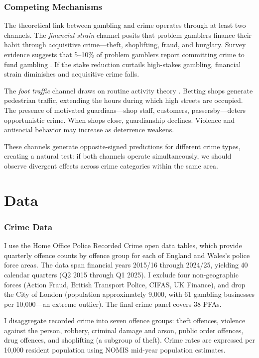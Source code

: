 \documentclass[12pt]{article}
\begin{document}
\subsubsection*{Competing Mechanisms} The theoretical link between gambling and crime operates through at least two channels. The \textit{financial strain} channel posits that problem gamblers finance their habit through acquisitive crime---theft, shoplifting, fraud, and burglary. Survey evidence suggests that 5--10\% of problem gamblers report committing crime to fund gambling \citep{banks2020gambling}. If the stake reduction curtails high-stakes gambling, financial strain diminishes and acquisitive crime falls.

The \textit{foot traffic} channel draws on routine activity theory \citep{cohen1979social}. Betting shops generate pedestrian traffic, extending the hours during which high streets are occupied. The presence of motivated guardians---shop staff, customers, passersby---deters opportunistic crime. When shops close, guardianship declines. Violence and antisocial behavior may increase as deterrence weakens.

These channels generate opposite-signed predictions for different crime types, creating a natural test: if both channels operate simultaneously, we should observe divergent effects across crime categories within the same area.


\section{Data}

\subsubsection*{Crime Data} I use the Home Office Police Recorded Crime open data tables, which provide quarterly offence counts by offence group for each of England and Wales's police force areas. The data span financial years 2015/16 through 2024/25, yielding 40 calendar quarters (Q2 2015 through Q1 2025). I exclude four non-geographic forces (Action Fraud, British Transport Police, CIFAS, UK Finance), and drop the City of London (population approximately 9,000, with 61 gambling businesses per 10,000---an extreme outlier). The final crime panel covers 38 PFAs.

I disaggregate recorded crime into seven offence groups: theft offences, violence against the person, robbery, criminal damage and arson, public order offences, drug offences, and shoplifting (a subgroup of theft). Crime rates are expressed per 10,000 resident population using NOMIS mid-year population estimates.
\end{document}
